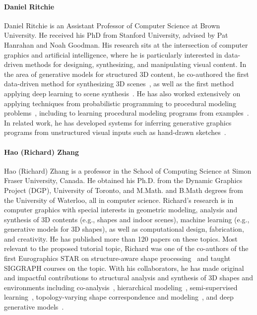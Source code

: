 \documentclass{egpubl}
\begin{document}
\paragraph*{Daniel Ritchie}
Daniel Ritchie is an Assistant Professor of Computer Science at Brown University.
He received his PhD from Stanford University, advised by Pat Hanrahan and Noah Goodman.
His research sits at the intersection of computer graphics and artificial intelligence, where he is particularly interested in data-driven methods for designing, synthesizing, and manipulating visual content.
In the area of generative models for structured 3D content, he co-authored the first data-driven method for synthesizing 3D scenes~\cite{SceneSynth}, as well as the first method applying deep learning to scene synthesis~\cite{DeepSynthSIGGRAPH2018}.
He has also worked extensively on applying techniques from probabilistic programming to procedural modeling problems~\cite{GraphicsHMC,SOSMC,NGPM}, including to learning procedural modeling programs from examples~\cite{ProcmodLearn}. 
In related work, he has developed systems for inferring generative graphics programs from unstructured visual inputs such as hand-drawn sketches~\cite{TikzPaper}.

\paragraph*{Hao (Richard) Zhang}
Hao (Richard) Zhang is a professor in the School of Computing Science at Simon Fraser University, Canada. He obtained his Ph.D. from the Dynamic Graphics Project (DGP), University of Toronto, and M.Math. and B.Math degrees from the University of Waterloo, all in computer science. Richard's research is in computer graphics with special interests in geometric modeling, analysis and synthesis of 3D contents (e.g., shapes and indoor scenes), machine learning (e.g., generative models for 3D shapes), as well as computational design, fabrication, and creativity. He has published more than 120 papers on these topics. Most relevant to the proposed tutorial topic, Richard was one of the co-authors of the first Eurographics STAR on structure-aware shape processing~\cite{mitra_star13} and taught SIGGRAPH courses on the topic. With his collaborators, he has made original and impactful contributions to structural analysis and synthesis of 3D shapes and environments including co-analysis~\cite{xu2010style,sidi_siga11,van2013co}, hierarchical modeling~\cite{wang2011symmetry,van2013co,li2017grass}, semi-supervised learning~\cite{wang_siga12,yu_tog18}, topology-varying shape correspondence and modeling~\cite{ib_siga15,alhashim_sig14,zhu_sig17}, and deep generative models~\cite{li2017grass,li2018grains,zhu2018scores}. 



\end{document}
